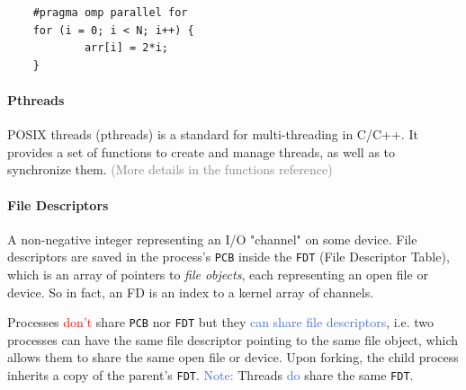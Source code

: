 \documentclass[openany,12pt]{book}
\newcommand{\code}[1]{\texttt{#1}}
\newcommand{\red}[1]{\textcolor{Red}{#1}}
\newcommand{\blue}[1]{\textcolor{RoyalBlue}{#1}}
\newcommand{\gray}[1]{\textcolor{gray}{#1}}
\begin{document}
\begin{center}
    \begin{minipage}{0.9\textwidth}
        \begin{lstlisting}
    #pragma omp parallel for
    for (i = 0; i < N; i++) {
            arr[i] = 2*i;
    } \end{lstlisting}
    \end{minipage}
\end{center}


\paragraph{Pthreads} POSIX threads (pthreads) is a standard for multi-threading in C/C++. It provides a set of functions to create and manage threads, as well as to synchronize them. \gray{(More details in the functions reference)}



\paragraph{File Descriptors} A non-negative integer representing an I/O "channel" on some device. File descriptors are saved in the process's \code{PCB} inside the \code{FDT} (File Descriptor Table), which is an array of pointers to \textit{file objects}, each representing an open file or device. So in fact, an FD is an index to a kernel array of channels.

Processes \red{don't} share \code{PCB} nor \code{FDT} but they \blue{can share file descriptors}, i.e. two processes can have the same file descriptor pointing to the same file object, which allows them to share the same open file or device. Upon forking, the child process inherits a copy of the parent's \code{FDT}. \blue{Note:} Threads \blue{do} share the same \code{FDT}.
\end{document}
